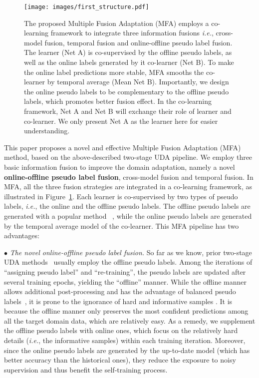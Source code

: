 \documentclass{bmvc2k}
\begin{document}
\begin{figure}
\begin{center}
\texttt{[image: images/first\_structure.pdf]}
\end{center}
\vspace{-20pt}
\caption{The proposed Multiple Fusion Adaptation (MFA) employs a co-learning framework to integrate three information fusions \emph{i.e.}, cross-model fusion, temporal fusion and online-offline pseudo label fusion. The learner (Net A) is co-supervised by the offline pseudo labels, as well as the online labels generated by it co-learner (Net B). To make the online label predictions more stable, MFA smooths the co-learner by temporal average (Mean Net B). Importantly, we design the online pseudo labels to be complementary to the offline pseudo labels, which promotes better fusion effect. In the co-learning framework, Net A and Net B will exchange their role of learner and co-learner. We only present Net A as the learner here for easier understanding. 
}
\label{fig: intro}
\end{figure}




This paper proposes a novel and effective Multiple Fusion Adaptation (MFA) method, based on the above-described two-stage UDA pipeline. We employ three basic information fusion to improve the domain adaptation, namely a novel \textbf{online-offline pseudo label fusion}, cross-model fusion and temporal fusion. In MFA, all the three fusion strategies are integrated in a co-learning framework, as illustrated in Figure~\ref{fig: intro}. Each learner is co-supervised by two types of pseudo labels, \emph{i.e.}, the online and the offline pseudo labels. The offline pseudo labels are generated with a popular method ~\cite{RN162}, while the online pseudo labels are generated by the temporal average model of the co-learner. This MFA pipeline has two advantages:


$\bullet$ \emph{The novel online-offline pseudo label fusion.} So far as we know, prior two-stage UDA methods~\cite{RN180,RN132} usually employ the offline pseudo labels. Among the iterations of ``assigning pseudo label'' and ``re-training'', the pseudo labels are updated after several training epochs, yielding the ``offline'' manner. While the offline manner allows additional post-processing and has the advantage of balanced pseudo labels~\cite{RN162}, it is prone to the ignorance of hard and informative samples \cite{RN204}. It is because the offline manner only preserves the most confident predictions among all the target domain data, which are relatively easy. As a remedy, we supplement the offline pseudo labels with online ones, which focus on the relatively hard details (\emph{i.e.}, the informative samples) within each training iteration. Moreover, since the online pseudo labels are generated by the up-to-date model (which has better accuracy than the historical ones), they reduce the exposure to noisy supervision and thus benefit the self-training process. 
\end{document}
